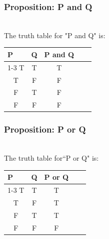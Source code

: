 \documentclass[aspectratio=169, handout]{beamer}
\numberwithin{equation}{section}
\begin{document}
\begin{frame}
\frametitle{Proposition: P and Q}

\ \\The truth table for "P and Q" is:

\begin{table}[]
\begin{tabular}{cccll}
\multicolumn{1}{l}{P} & \multicolumn{1}{l}{Q} & \multicolumn{1}{l}{P and Q} &  &  \\ \cline{1-3}
T                     & T                     & T                           &  &  \\
T                     & F                     & F                           &  &  \\
F                     & T                     & F                           &  &  \\
F                     & F                     & F                           &  & 
\end{tabular}
\end{table} \pause


\end{frame}



\begin{frame}
\frametitle{Proposition: P or Q}

\ \\The truth table for``P or Q" is:

\begin{table}[]
\begin{tabular}{cccll}
\multicolumn{1}{l}{P} & \multicolumn{1}{l}{Q} & \multicolumn{1}{l}{P or Q} &  &  \\ \cline{1-3}
T                     & T                     & T                          &  &  \\
T                     & F                     & T                          &  &  \\
F                     & T                     & T                          &  &  \\
F                     & F                     & F                          &  & 
\end{tabular}
\end{table} \pause

\end{frame}
\end{document}
